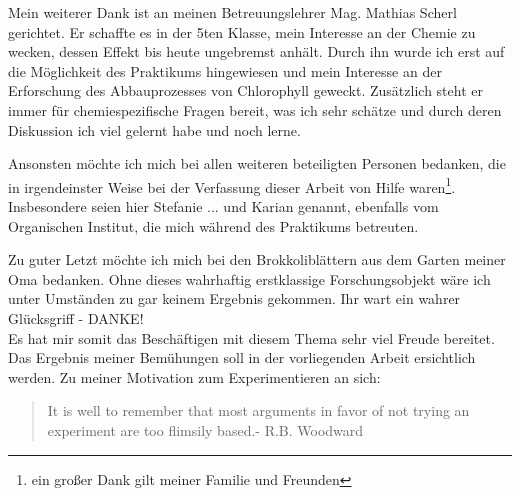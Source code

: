 Mein weiterer Dank ist an meinen Betreuungslehrer Mag. Mathias Scherl gerichtet. Er schaffte es in der 5ten Klasse, mein Interesse an der Chemie zu wecken, dessen Effekt bis heute ungebremst anhält. Durch ihn wurde ich erst auf die Möglichkeit des Praktikums hingewiesen und mein Interesse an der Erforschung des Abbauprozesses von Chlorophyll geweckt. Zusätzlich steht er immer für chemiespezifische Fragen bereit, was ich sehr schätze und durch deren Diskussion ich viel gelernt habe und noch lerne. 

Ansonsten möchte ich mich bei allen weiteren beteiligten Personen bedanken, die in irgendeinster Weise bei der Verfassung dieser Arbeit von Hilfe waren\footnote{ein großer Dank gilt meiner Familie und Freunden}. Insbesondere seien hier Stefanie ... und Karian genannt, ebenfalls vom Organischen Institut, die mich während des Praktikums betreuten.  

Zu guter Letzt möchte ich mich bei den Brokkoliblättern aus dem Garten meiner Oma bedanken. Ohne dieses wahrhaftig erstklassige Forschungsobjekt wäre ich unter Umständen zu gar keinem Ergebnis gekommen. Ihr wart ein wahrer Glücksgriff - DANKE! \\

Es hat mir somit das Beschäftigen mit diesem Thema sehr viel Freude bereitet. Das Ergebnis meiner Bemühungen soll in der vorliegenden Arbeit ersichtlich werden. Zu meiner Motivation zum Experimentieren an sich: \\

\begin{quotation}
 \glqq It is well to remember that most arguments in favor of not trying an experiment are too flimsily based.\grqq - R.B. Woodward
 \end{quotation} 

